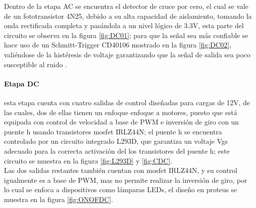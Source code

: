 	
		Dentro de la etapa AC se encuentra el detector de cruce por cero, el cual se vale de un fototransistor 4N25, debido a su alta capacidad de aislamiento, tomando la onda rectificada completa y pasándola a un nivel lógico de 3.3V, esta parte del circuito se observa en la figura \ref{fig:DC01}; para que la señal sea más confiable se hace uso de un Schmitt-Trigger CD40106 mostrado en la figura \ref{fig:DC02}, valiéndose de la histéresis de voltaje garantizando que la señal de salida sea poco susceptible al ruido \cite{DC0}.\\
		
%	
	
	\paragraph{Etapa DC}
		esta etapa cuenta con cuatro salidas de control diseñadas para cargas de 12V, de las cuales, dos de ellas tienen un enfoque enfoque a motores, puesto que está equipada con control de velocidad a base de PWM e inversión de giro con un puente h usando transistores mosfet IRLZ44N; el puente h se encuentra controlado por un circuito integrado L293D, que garantiza un voltaje Vgs adecuado para la correcta activación del los transistores del puente h; este circuito se muestra en la figura \ref{fig:L293D} y \ref{fig:CDC}.\\
		
		Las dos salidas restantes también cuentan con mosfet IRLZ44N, y su control igualmente es a base de PWM, mas no permite realizar la inversión de giro, por lo cual se enfoca a dispositivos como lámparas LEDs, el diseño en proteus se muestra en la figura \ref{fig:ONOFDC}.\\
		
